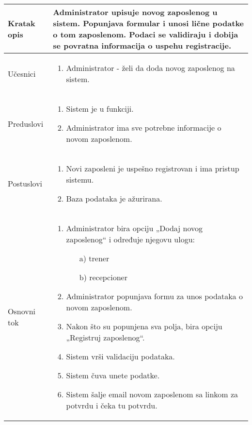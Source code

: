 \documentclass[../main.tex]{subfiles}
\begin{document}
\begin{longtable}{| p{} | p{} |} 

\hline
    Kratak opis &  Administrator upisuje novog zaposlenog u sistem. Popunjava formular i unosi lične podatke o tom zaposlenom. Podaci se validiraju i dobija se povratna informacija o uspehu registracije.\\ 
\hline    
    Učesnici & 
    	\begin{enumerate}
        \item Administrator - želi da doda novog zaposlenog na sistem.
     \end{enumerate}\\
\hline
   Preduslovi & \begin{enumerate}
       \item Sistem je u funkciji.
       \item Administrator ima sve potrebne informacije o novom zaposlenom.
   \end{enumerate}\\
\hline  
    Postuslovi & \begin{enumerate}
        \item Novi zaposleni je uspešno registrovan i ima pristup sistemu.
        \item Baza podataka je ažurirana.
    \end{enumerate}\\
\hline
    Osnovni tok & \begin{enumerate}
        \item Administrator bira opciju „Dodaj novog zaposlenog“ i određuje njegovu ulogu: 
            \begin{itemize}
                \item[a)] trener
                \item[b)] recepcioner
            \end{itemize}
        \item Administrator popunjava formu za unos podataka o novom zaposlenom.	
        \item Nakon što su popunjena sva polja, bira opciju „Registruj zaposlenog“.
        \item Sistem vrši validaciju podataka.
        \item Sistem čuva unete podatke.
        \item Sistem šalje email novom zaposlenom sa linkom za potvrdu i čeka tu potvrdu.

\end{enumerate}
\end{longtable}
\end{document}
